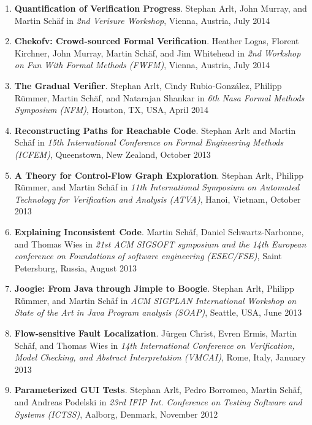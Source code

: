 \begin{enumerate}
\item \textbf{Quantification of Verification Progress}.
Stephan Arlt, John Murray, and Martin Sch\"af in \emph{2nd Verisure Workshop},
Vienna, Austria, July 2014


\item \textbf{Chekofv: Crowd-sourced Formal Verification}.
Heather Logas, Florent Kirchner, John Murray, Martin Sch\"af, and Jim Whitehead
in \emph{2nd Workshop on Fun With Formal Methods (FWFM)}, Vienna, Austria, July
2014


\item \textbf{The Gradual Verifier}.
Stephan Arlt, Cindy Rubio-Gonz\'alez, Philipp R\"ummer,
Martin Sch\"af, and Natarajan Shankar in \emph{6th Nasa Formal Methods
Symposium (NFM)}, Houston, TX, USA, April 2014


\item \textbf{Reconstructing Paths for Reachable Code}.
Stephan Arlt and  Martin Sch\"af in \emph{15th International Conference on
Formal Engineering Methods (ICFEM)}, Queenstown, New Zealand, October 2013


\item \textbf{A Theory for Control-Flow Graph Exploration}.
Stephan Arlt, Philipp R\"ummer, and  Martin Sch\"af in \emph{11th International
Symposium on Automated Technology for Verification and Analysis (ATVA)},
Hanoi, Vietnam, October 2013

\item \textbf{Explaining Inconsistent Code}.  
Martin Sch\"af, Daniel Schwartz-Narbonne, and Thomas Wies in \emph{21st ACM
SIGSOFT symposium and the 14th European conference on Foundations of software
engineering (ESEC/FSE)}, Saint Petersburg, Russia, August 2013


\item \textbf{Joogie: From Java through Jimple to Boogie}. Stephan
Arlt, Philipp R\"ummer, and  Martin Sch\"af  in \emph{ ACM SIGPLAN International Workshop 
on State of the Art in Java Program analysis (SOAP)}, Seattle, USA, June 2013


\item \textbf{Flow-sensitive Fault Localization}.  J\"urgen Christ, Evren Ermis, Martin Sch\"af, 
and Thomas Wies in \emph{14th International Conference on Verification, Model Checking, and 
Abstract Interpretation (VMCAI)}, Rome, Italy, January 2013

\item \textbf{Parameterized GUI Tests}. Stephan
Arlt, Pedro Borromeo,  Martin Sch\"af, and Andreas Podelski  in \emph{ 23rd
IFIP Int. Conference on Testing Software and Systems (ICTSS)}, Aalborg, Denmark,
November 2012


\end{enumerate}
